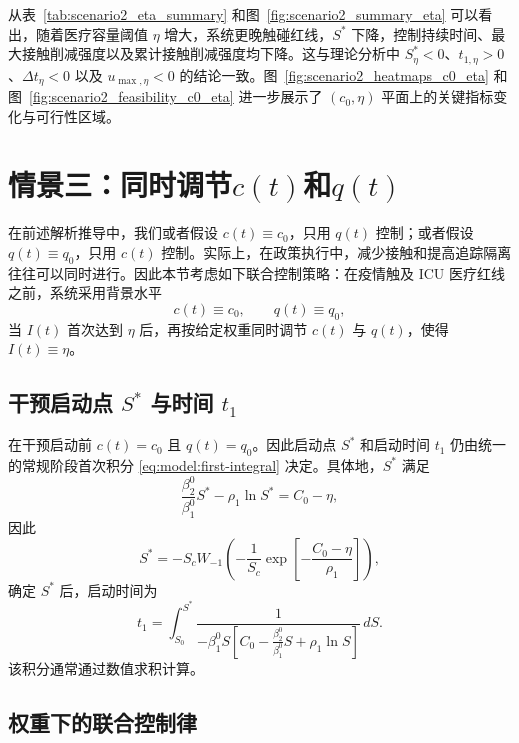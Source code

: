 从表~\ref{tab:scenario2_eta_summary} 和图~\ref{fig:scenario2_summary_eta} 可以看出，随着医疗容量阈值 $\eta$ 增大，系统更晚触碰红线，$S^*$ 下降，控制持续时间、最大接触削减强度以及累计接触削减强度均下降。这与理论分析中 $S^*_\eta<0$、$t_{1,\eta}>0$、$\Delta t_\eta<0$ 以及 $u_{\max,\eta}<0$ 的结论一致。图~\ref{fig:scenario2_heatmaps_c0_eta} 和图~\ref{fig:scenario2_feasibility_c0_eta} 进一步展示了 $(c_0,\eta)$ 平面上的关键指标变化与可行性区域。

\section{情景三：同时调节$c(t)$和$q(t)$}

在前述解析推导中，我们或者假设 $c(t)\equiv c_0$，只用 $q(t)$ 控制；或者假设 $q(t)\equiv q_0$，只用 $c(t)$ 控制。实际上，在政策执行中，减少接触和提高追踪隔离往往可以同时进行。因此本节考虑如下联合控制策略：在疫情触及 ICU 医疗红线之前，系统采用背景水平
\begin{equation}
c(t)\equiv c_0,\qquad q(t)\equiv q_0,
\end{equation}
当 $I(t)$ 首次达到 $\eta$ 后，再按给定权重同时调节 $c(t)$ 与 $q(t)$，使得 $I(t)\equiv \eta$。

\subsection{干预启动点 $S^*$ 与时间 $t_1$}
在干预启动前 $c(t)=c_0$ 且 $q(t)=q_0$。因此启动点 $S^*$ 和启动时间 $t_1$ 仍由统一的常规阶段首次积分 \eqref{eq:model:first-integral} 决定。具体地，$S^*$ 满足
\begin{equation}
\frac{\beta_2^0}{\beta_1^0}S^*-\rho_1\ln S^*
=
C_0-\eta,
\label{eq:s3:Sstar-equation}
\end{equation}
因此
\begin{equation}
S^*
=
-S_c W_{-1}\left(
-\frac{1}{S_c}\exp\left[-\frac{C_0-\eta}{\rho_1}\right]
\right),
\label{eq:s3:Sstar-lambert}
\end{equation}
确定 $S^*$ 后，启动时间为
\begin{equation}
t_1
=
\int_{S_0}^{S^*}
\frac{1}{-\beta_1^0 S\left[
C_0-\frac{\beta_2^0}{\beta_1^0}S+\rho_1\ln S
\right]}\,dS.
\label{eq:s3:t1}
\end{equation}
该积分通常通过数值求积计算。


\subsection{权重下的联合控制律}

